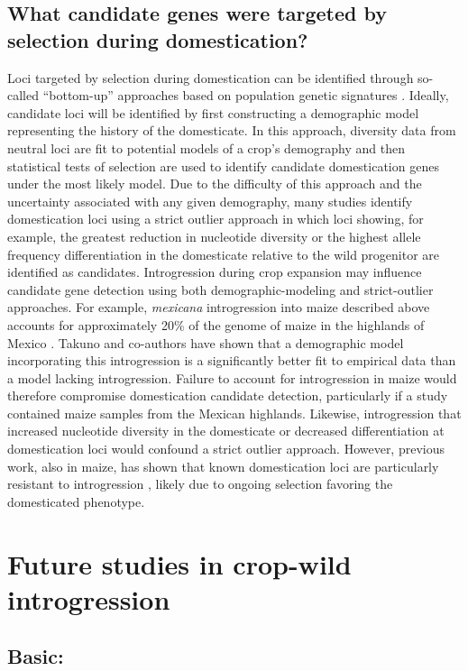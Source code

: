 \documentclass[11pt]{article}
\begin{document}
\subsection*{What candidate genes were targeted by selection during domestication?}
Loci targeted by selection during domestication can be identified through so-called ``bottom-up'' approaches based on population genetic signatures \cite{Ross-Ibarra2007}.
Ideally, candidate loci will be identified by first constructing a demographic model representing the history of the domesticate.
In this approach, diversity data from neutral loci are fit to potential models of a crop's demography and then statistical tests of selection are used to identify candidate domestication genes under the most likely model.
Due to the difficulty of this approach and the uncertainty associated with any given demography, many studies identify domestication loci using a strict outlier approach in which loci showing, for example, the greatest reduction in nucleotide diversity or the highest allele frequency differentiation in the domesticate relative to the wild progenitor are identified as candidates.
Introgression during crop expansion may influence candidate gene detection using both demographic-modeling and strict-outlier approaches.
For example, \emph{mexicana} introgression into maize described above accounts for approximately 20\% of the genome of maize in the highlands of Mexico \cite{vanHeerwaarden2011}.
Takuno and co-authors \cite{Takuno2015} have shown that a demographic model incorporating this introgression is a significantly better fit to empirical data than a model lacking introgression.
Failure to account for introgression in maize would therefore compromise domestication candidate detection, particularly if a study contained maize samples from the Mexican highlands.
Likewise, introgression that increased nucleotide diversity in the domesticate or decreased differentiation at domestication loci would confound a strict outlier approach.
However, previous work, also in maize, has shown that known domestication loci are particularly resistant to introgression \cite{Hufford2013}, likely due to ongoing selection favoring the domesticated phenotype.


\section*{Future studies in crop-wild introgression}


\subsection*{Basic:}%
\end{document}
